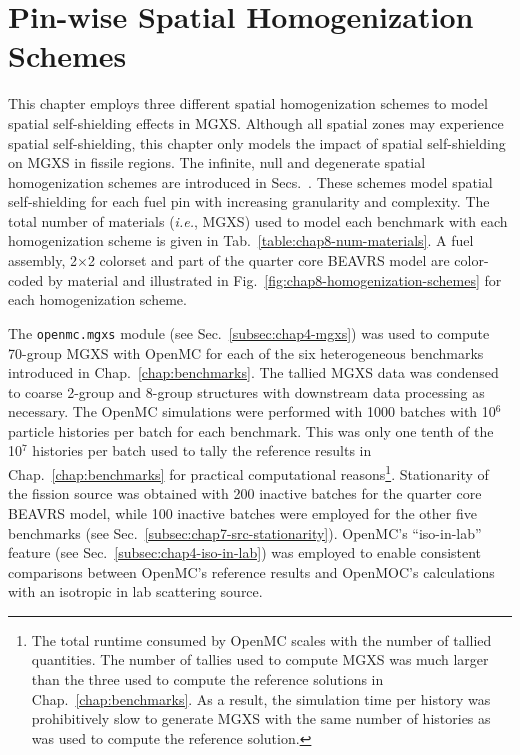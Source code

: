 \section{Pin-wise Spatial Homogenization Schemes}
\label{sec:chap8-pinwise-space-homogenize}

This chapter employs three different spatial homogenization schemes to model spatial self-shielding effects in \ac{MGXS}. Although all spatial zones may experience spatial self-shielding, this chapter only models the impact of spatial self-shielding on \ac{MGXS} in fissile regions. The infinite, null and degenerate spatial homogenization schemes are introduced in Secs.~. These schemes model spatial self-shielding for each fuel pin with increasing granularity and complexity. The total number of materials (\textit{i.e.}, \ac{MGXS}) used to model each benchmark with each homogenization scheme is given in Tab.~\ref{table:chap8-num-materials}. A fuel assembly, 2$\times$2 colorset and part of the quarter core \ac{BEAVRS} model are color-coded by material and illustrated in Fig.~\ref{fig:chap8-homogenization-schemes} for each homogenization scheme.

The \texttt{openmc.mgxs} module (see Sec.~\ref{subsec:chap4-mgxs}) was used to compute 70-group \ac{MGXS} with OpenMC for each of the six heterogeneous benchmarks introduced in Chap.~\ref{chap:benchmarks}. The tallied \ac{MGXS} data was condensed to coarse 2-group and 8-group structures with downstream data processing as necessary. The OpenMC simulations were performed with 1000 batches with 10$^{6}$ particle histories per batch for each benchmark. This was only one tenth of the 10$^7$ histories per batch used to tally the reference results in Chap.~\ref{chap:benchmarks} for practical computational reasons\footnote{The total runtime consumed by OpenMC scales with the number of tallied quantities. The number of tallies used to compute \ac{MGXS} was much larger than the three used to compute the reference solutions in Chap.~\ref{chap:benchmarks}. As a result, the simulation time per history was prohibitively slow to generate \ac{MGXS} with the same number of histories as was used to compute the reference solution.}. Stationarity of the fission source was obtained with 200 inactive batches for the quarter core \ac{BEAVRS} model, while 100 inactive batches were employed for the other five benchmarks (see Sec.~\ref{subsec:chap7-src-stationarity}). OpenMC's ``iso-in-lab'' feature (see Sec.~\ref{subsec:chap4-iso-in-lab}) was employed to enable consistent comparisons between OpenMC's reference results and OpenMOC's calculations with an isotropic in lab scattering source.

